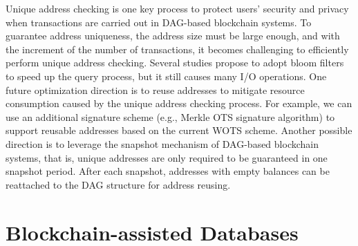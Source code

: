 \documentclass[acmsmall]{acmart}
\begin{document}
Unique address checking is one key process to protect users' security and privacy when transactions are carried out in DAG-based blockchain systems. To guarantee address uniqueness, the address size must be large enough, and with the increment of the number of transactions, it becomes challenging to efficiently perform unique address checking. Several studies propose to adopt bloom filters to speed up the query process, but it still causes many I/O operations. One future optimization direction is to reuse addresses to mitigate resource consumption caused by the unique address checking process.
For example, we can use an additional signature scheme (e.g., Merkle OTS signature algorithm) to support reusable addresses based on the current WOTS scheme. Another possible direction is to leverage the snapshot mechanism of DAG-based blockchain systems, that is, unique addresses are only required to be guaranteed in one snapshot period. After each snapshot, addresses with empty balances can be reattached to the DAG structure for address reusing.



\section{Blockchain-assisted Databases}
\label{sec:app}
\end{document}
